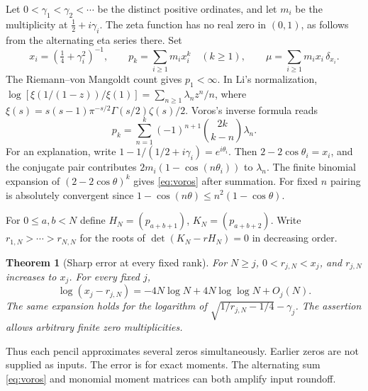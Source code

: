 \documentclass[11pt]{article}
\newtheorem{theorem}{Theorem}
\newcommand{\g}{\gamma}
\newcommand{\rj}{r_{j,N}}
\begin{document}
Let $0<\g_1<\g_2<\cdots$ be the distinct positive ordinates, and let $m_i$ be the multiplicity at $\tfrac12+i\g_i$. The zeta function has no real zero in $(0,1)$, as follows from the alternating eta series there. Set
\begin{equation}
 x_i=(\tfrac14+\g_i^2)^{-1},\qquad p_k=\sum_{i\ge1}m_i x_i^k\quad(k\ge1),\qquad
 \mu=\sum_{i\ge1}m_i x_i\,\delta_{x_i}.
 \label{eq:mu}
\end{equation}
The Riemann--von Mangoldt count gives $p_1<\infty$. In Li's normalization,
$\log[\xi(1/(1-z))/\xi(1)]=\sum_{n\ge1}\lambda_n z^n/n$, where $\xi(s)=s(s-1)\pi^{-s/2}\Gamma(s/2)\zeta(s)/2$. Voros's inverse formula \cite[eq.~(11)]{voros} reads
\begin{equation}
 p_k=\sum_{n=1}^k(-1)^{n+1}\binom{2k}{k-n}\lambda_n .
 \label{eq:voros}
\end{equation}
For an explanation, write $1-1/(1/2+i\g_i)=e^{i\theta_i}$. Then $2-2\cos\theta_i=x_i$, and the conjugate pair contributes $2m_i(1-\cos(n\theta_i))$ to $\lambda_n$. The finite binomial expansion of $(2-2\cos\theta)^k$ gives \eqref{eq:voros} after summation. For fixed $n$ pairing is absolutely convergent since $1-\cos(n\theta)\le n^2(1-\cos\theta)$.

For $0\le a,b<N$ define $H_N=(p_{a+b+1})$, $K_N=(p_{a+b+2})$. Write $r_{1,N}>\cdots>r_{N,N}$ for the roots of $\det(K_N-rH_N)=0$ in decreasing order.
\begin{theorem}[Sharp error at every fixed rank]\label{th:rate}
For $N\ge j$, $0<\rj<x_j$, and $\rj$ increases to $x_j$. For every fixed $j$,
\begin{equation}
 \log(x_j-\rj)=-4N\log N+4N\log\log N+O_j(N).
 \label{eq:main}
\end{equation}
The same expansion holds for the logarithm of
$\sqrt{1/\rj-1/4}-\g_j$. The assertion allows arbitrary finite zero multiplicities.
\end{theorem}
Thus each pencil approximates several zeros simultaneously. Earlier zeros are not supplied as inputs. The error is for exact moments. The alternating sum \eqref{eq:voros} and monomial moment matrices can both amplify input roundoff.
\end{document}
